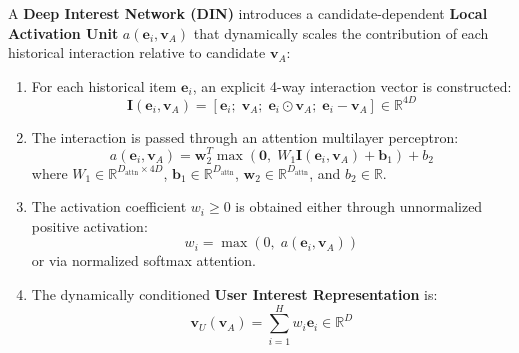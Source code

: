 \documentclass[11pt,a4paper]{article}
\theoremstyle{definition}
\begin{document}
A \textbf{Deep Interest Network (DIN)} introduces a candidate-dependent \textbf{Local Activation Unit} $a(\mathbf{e}_i, \mathbf{v}_A)$ that dynamically scales the contribution of each historical interaction relative to candidate $\mathbf{v}_A$:
\begin{enumerate}
    \item For each historical item $\mathbf{e}_i$, an explicit 4-way interaction vector is constructed:
    {\boldmath
    \begin{equation}
    \mathbf{I}(\mathbf{e}_i, \mathbf{v}_A) = \left[ \mathbf{e}_i; \; \mathbf{v}_A; \; \mathbf{e}_i \odot \mathbf{v}_A; \; \mathbf{e}_i - \mathbf{v}_A \right] \in \mathbb{R}^{4D}
    \end{equation}
    }
    \item The interaction is passed through an attention multilayer perceptron:
    {\boldmath
    \begin{equation}
    a(\mathbf{e}_i, \mathbf{v}_A) = \mathbf{w}_2^T \max\left( \mathbf{0}, \; W_1 \mathbf{I}(\mathbf{e}_i, \mathbf{v}_A) + \mathbf{b}_1 \right) + b_2
    \end{equation}
    }
    where $W_1 \in \mathbb{R}^{D_{\text{attn}} \times 4D}$, $\mathbf{b}_1 \in \mathbb{R}^{D_{\text{attn}}}$, $\mathbf{w}_2 \in \mathbb{R}^{D_{\text{attn}}}$, and $b_2 \in \mathbb{R}$.
    \item The activation coefficient $w_i \ge 0$ is obtained either through unnormalized positive activation:
    {\boldmath
    \begin{equation}
    w_i = \max\left( 0, \; a(\mathbf{e}_i, \mathbf{v}_A) \right)
    \end{equation}
    }
    or via normalized softmax attention.
    \item The dynamically conditioned \textbf{User Interest Representation} is:
    {\boldmath
    \begin{equation}
    \mathbf{v}_U(\mathbf{v}_A) = \sum_{i=1}^H w_i \mathbf{e}_i \in \mathbb{R}^D
    \end{equation}
    }
\end{enumerate}
\end{document}
